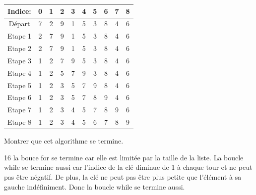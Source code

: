 \documentclass[a4paper,10pt]{report}
\def\documentpath{./Sources_Latex}
\begin{document}
\begin{enumerate}
\begin{minipage}{0.48\linewidth}
    \begin{tabular}{|c|c|c|c|c|c|c|c|c|c|}
        \hline
        Indice: & 0 & 1 & 2 & 3 & 4 & 5 & 6 & 7 & 8 \\ \hline
        Départ&7&2&9&1&5&3&8&4&6 \\ \hline
        Etape 1&2&7&9&1&5&3&8&4&6 \\ \hline
        Etape 2&2&7&9&1&5&3&8&4&6 \\ \hline
        Etape 3&1&2&7&9&5&3&8&4&6 \\ \hline
        Etape 4&1&2&5&7&9&3&8&4&6 \\ \hline
        Etape 5&1&2&3&5&7&9&8&4&6 \\ \hline
        Etape 6&1&2&3&5&7&8&9&4&6 \\ \hline
        Etape 7&1&2&3&4&5&7&8&9&6 \\ \hline
        Etape 8&1&2&3&4&5&6&7&8&9 \\ \hline
    \end{tabular}
    \end{minipage}\hfill
    \begin{minipage}{0.48\linewidth}
        \item Montrer que cet algorithme se termine.
    \begin{answer}{1}{6}
        la bouce for se termine car elle est limitée par la taille de la liste. La boucle while se termine aussi car l'indice de la clé diminue de 1 à chaque tour et ne peut pas être négatif.
        De plus, la clé ne peut pas être plus petite que l'élément à sa gauche indéfiniment. Donc la boucle while se termine aussi.
    \end{answer}
    \end{minipage}
    
\end{enumerate}

\end{document}
